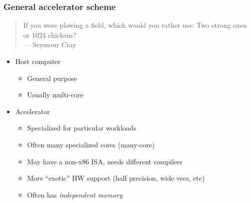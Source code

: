 \documentclass{beamer}
\begin{document}
\begin{frame}
  \frametitle{General accelerator scheme}

  \begin{quote}
    If you were plowing a field, which would you rather use: Two
    strong oxen or 1024 chickens? \\
    \hfill --- Seymour Cray
  \end{quote}
  \begin{itemize}
  \item Host computer
    \begin{itemize}
    \item General purpose
    \item Usually multi-core
    \end{itemize}
  \item Accelerator
    \begin{itemize}
    \item Specialized for particular workloads
    \item Often many specialized cores (many-core)
    \item May have a non-x86 ISA, needs different compilers
    \item More ``exotic'' HW support (half precision, wide vecs, etc)
    \item Often has {\em independent memory}
    \end{itemize}
  \end{itemize}
    
\end{frame}
\end{document}
